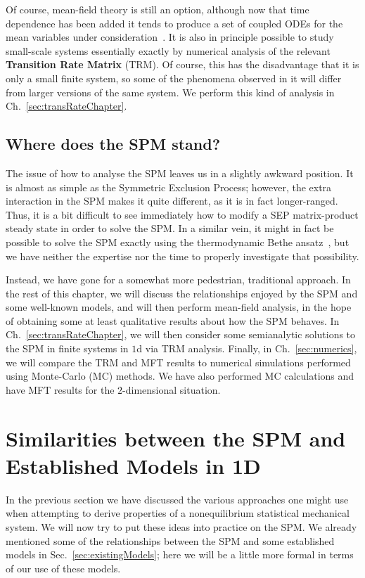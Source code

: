 Of course, mean-field theory is still an option, although now that time dependence has been added
it tends to produce a set of coupled ODEs for the mean variables under consideration~\cite{Kolesnichenko2014}. It is also in
principle possible to study small-scale systems essentially exactly by numerical analysis of the
relevant \textbf{Transition Rate Matrix} (TRM). Of course, this has the disadvantage that it is only a
small finite system, so some of the phenomena observed in it will differ from larger versions of the
same system. We perform this kind of analysis in Ch.~\ref{sec:transRateChapter}.


\subsection{Where does the SPM stand?} \label{sec:spmStatus}
The issue of how to analyse the SPM leaves us in a slightly awkward position. It is almost as simple
as the Symmetric Exclusion Process; however, the extra interaction in the SPM makes it quite
different, as it is in fact longer-ranged. Thus, it is a bit difficult to see immediately how to
modify a SEP matrix-product steady state in order to solve the SPM. In a similar vein, it might 
in fact be possible to solve the SPM exactly using the thermodynamic Bethe ansatz~\cite{van2016},
but we have neither
the expertise nor the time to properly investigate that possibility.

Instead, we have gone for a somewhat more pedestrian, traditional approach. In the rest of this
chapter, we will discuss the relationships enjoyed by the SPM and some well-known models,
and will then perform  mean-field analysis, in the hope of obtaining some at least qualitative
results about how the SPM behaves. In Ch.~\ref{sec:transRateChapter}, we will then consider some semianalytic solutions to the SPM
in finite systems in $1$d via TRM analysis. Finally, in Ch.~\ref{sec:numerics}, we will compare the TRM and MFT results to numerical simulations performed using Monte-Carlo (MC) methods. We have also performed
MC calculations and have MFT results for the $2$-dimensional situation.


\section{Similarities between the SPM and Established Models in 1D}
In the previous section we have discussed the various approaches one might use when attempting to derive properties of a nonequilibrium statistical mechanical system. We will now try to put these ideas into practice on the SPM. We already mentioned some of the relationships between the SPM
and some established models in Sec.~\ref{sec:existingModels}; here we will be a little more formal
in terms of our use of these models.



